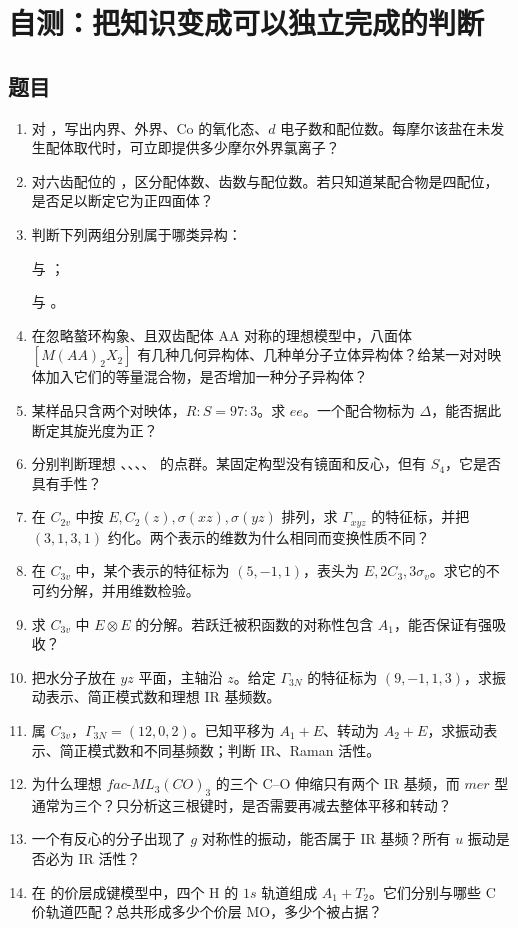 \section{自测：把知识变成可以独立完成的判断}

\subsection*{题目}
\begin{enumerate}[label=\textbf{\arabic*.},itemsep=0.65em]
\item 对 ，写出内界、外界、Co 的氧化态、$d$ 电子数和配位数。每摩尔该盐在未发生配体取代时，可立即提供多少摩尔外界氯离子？
\item 对六齿配位的 \ce{[Co(edta)]^-}，区分配体数、齿数与配位数。若只知道某配合物是四配位，是否足以断定它为正四面体？
\item 判断下列两组分别属于哪类异构：
\par {} 与 ；
\par {} 与 。
\item 在忽略螯环构象、且双齿配体 AA 对称的理想模型中，八面体 $[M(AA)_2X_2]$ 有几种几何异构体、几种单分子立体异构体？给某一对对映体加入它们的等量混合物，是否增加一种分子异构体？
\item 某样品只含两个对映体，$R:S=97:3$。求 $ee$。一个配合物标为 $\Delta$，能否据此断定其旋光度为正？
\item 分别判断理想 、、、、 的点群。某固定构型没有镜面和反心，但有 $S_4$，它是否具有手性？
\item 在 $C_{2v}$ 中按 $E,C_2(z),\sigma(xz),\sigma(yz)$ 排列，求 $\Gamma_{xyz}$ 的特征标，并把 $(3,1,3,1)$ 约化。两个表示的维数为什么相同而变换性质不同？
\item 在 $C_{3v}$ 中，某个表示的特征标为 $(5,-1,1)$，表头为 $E,2C_3,3\sigma_v$。求它的不可约分解，并用维数检验。
\item 求 $C_{3v}$ 中 $E\otimes E$ 的分解。若跃迁被积函数的对称性包含 $A_1$，能否保证有强吸收？
\item 把水分子放在 $yz$ 平面，主轴沿 $z$。给定 $\Gamma_{3N}$ 的特征标为 $(9,-1,1,3)$，求振动表示、简正模式数和理想 IR 基频数。
\item {} 属 $C_{3v}$，$\Gamma_{3N}=(12,0,2)$。已知平移为 $A_1+E$、转动为 $A_2+E$，求振动表示、简正模式数和不同基频数；判断 IR、Raman 活性。
\item 为什么理想 $fac$-$ML_3(CO)_3$ 的三个 C--O 伸缩只有两个 IR 基频，而 $mer$ 型通常为三个？只分析这三根键时，是否需要再减去整体平移和转动？
\item 一个有反心的分子出现了 $g$ 对称性的振动，能否属于 IR 基频？所有 $u$ 振动是否必为 IR 活性？
\item 在  的价层成键模型中，四个 H 的 $1s$ 轨道组成 $A_1+T_2$。它们分别与哪些 C 价轨道匹配？总共形成多少个价层 MO，多少个被占据？
\end{enumerate}


